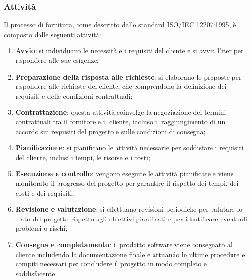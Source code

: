 \subsubsection{Attività}
Il processo di fornitura, come descritto dallo standard \href{https://www.math.unipd.it/~tullio/IS-1/2009/Approfondimenti/ISO_12207-1995.pdf}{ISO/IEC 12207:1995}, è composto dalle seguenti attività:
\begin{enumerate}
    \item \textbf{Avvio}: si individuano le necessità e i requisiti del cliente e si avvia l'iter per rispondere alle sue esigenze;
    \item \textbf{Preparazione della risposta alle richieste}: si elaborano le proposte per rispondere alle richieste del cliente, che comprendono la definizione dei requisiti e delle condizioni contrattuali;
    \item \textbf{Contrattazione}: questa attività coinvolge la negoziazione dei termini contrattuali tra il fornitore e il cliente, incluso il raggiungimento di un accordo sui requisiti del progetto e sulle condizioni di consegna;
    \item \textbf{Pianificazione}: si pianificano le attività necessarie per soddisfare i requisiti del cliente, inclusi i tempi, le risorse e i costi;
    \item \textbf{Esecuzione e controllo}: vengono eseguite le attività pianificate e viene monitorato il progresso del progetto per garantire il rispetto dei tempi, dei costi e dei requisiti;
    \item \textbf{Revisione e valutazione}:  si effettuano revisioni periodiche per valutare lo stato del progetto rispetto agli obiettivi pianificati e per identificare eventuali problemi o rischi;
    \item \textbf{Consegna e completamento}: il prodotto software viene consegnato al cliente includendo la documentazione finale e attuando le ultime procedure e compiti necessari per concludere il progetto in modo completo e soddisfacente.
\end{enumerate}

